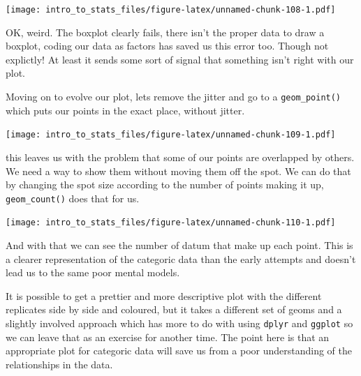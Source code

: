 \documentclass[
]{book}
\newenvironment{Shaded}{\begin{snugshade}}{\end{snugshade}}
\newcommand{\DataTypeTok}[1]{\textcolor[rgb]{0.13,0.29,0.53}{#1}}
\newcommand{\KeywordTok}[1]{\textcolor[rgb]{0.13,0.29,0.53}{\textbf{#1}}}
\newcommand{\NormalTok}[1]{#1}
\newcommand{\OperatorTok}[1]{\textcolor[rgb]{0.81,0.36,0.00}{\textbf{#1}}}
\newcommand{\StringTok}[1]{\textcolor[rgb]{0.31,0.60,0.02}{#1}}
\begin{document}
\texttt{[image: intro\_to\_stats\_files/figure-latex/unnamed-chunk-108-1.pdf]}

OK, weird. The boxplot clearly fails, there isn't the proper data to draw a boxplot, coding our data as factors has saved us this error too. Though not explictly! At least it sends some sort of signal that something isn't right with our plot.

Moving on to evolve our plot, lets remove the jitter and go to a \texttt{geom\_point()} which puts our points in the exact place, without jitter.

\begin{Shaded}
\end{Shaded}

\texttt{[image: intro\_to\_stats\_files/figure-latex/unnamed-chunk-109-1.pdf]}

this leaves us with the problem that some of our points are overlapped by others. We need a way to show them without moving them off the spot. We can do that by changing the spot size according to the number of points making it up, \texttt{geom\_count()} does that for us.

\begin{Shaded}
\end{Shaded}

\texttt{[image: intro\_to\_stats\_files/figure-latex/unnamed-chunk-110-1.pdf]}

And with that we can see the number of datum that make up each point. This is a clearer representation of the categoric data than the early attempts and doesn't lead us to the same poor mental models.

It is possible to get a prettier and more descriptive plot with the different replicates side by side and coloured, but it takes a different set of geoms and a slightly involved approach which has more to do with using \texttt{dplyr} and \texttt{ggplot} so we can leave that as an exercise for another time. The point here is that an appropriate plot for categoric data will save us from a poor understanding of the relationships in the data.
\end{document}
